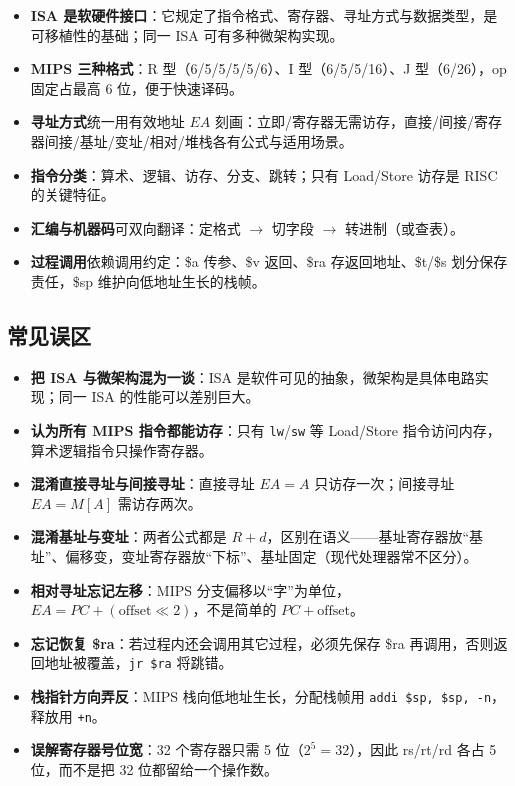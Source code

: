 \begin{itemize}
    \item \textbf{ISA 是软硬件接口}：它规定了指令格式、寄存器、寻址方式与数据类型，是可移植性的基础；同一 ISA 可有多种微架构实现。
    \item \textbf{MIPS 三种格式}：R 型（6/5/5/5/5/6）、I 型（6/5/5/16）、J 型（6/26），op 固定占最高 6 位，便于快速译码。
    \item \textbf{寻址方式}统一用有效地址 $EA$ 刻画：立即/寄存器无需访存，直接/间接/寄存器间接/基址/变址/相对/堆栈各有公式与适用场景。
    \item \textbf{指令分类}：算术、逻辑、访存、分支、跳转；只有 Load/Store 访存是 RISC 的关键特征。
    \item \textbf{汇编与机器码}可双向翻译：定格式 $\to$ 切字段 $\to$ 转进制（或查表）。
    \item \textbf{过程调用}依赖调用约定：\$a 传参、\$v 返回、\$ra 存返回地址、\$t/\$s 划分保存责任，\$sp 维护向低地址生长的栈帧。
\end{itemize}

\subsection{常见误区}

\begin{itemize}
    \item \textbf{把 ISA 与微架构混为一谈}：ISA 是软件可见的抽象，微架构是具体电路实现；同一 ISA 的性能可以差别巨大。
    \item \textbf{认为所有 MIPS 指令都能访存}：只有 \texttt{lw}/\texttt{sw} 等 Load/Store 指令访问内存，算术逻辑指令只操作寄存器。
    \item \textbf{混淆直接寻址与间接寻址}：直接寻址 $EA = A$ 只访存一次；间接寻址 $EA = M[A]$ 需访存两次。
    \item \textbf{混淆基址与变址}：两者公式都是 $R+d$，区别在语义——基址寄存器放“基址”、偏移变，变址寄存器放“下标”、基址固定（现代处理器常不区分）。
    \item \textbf{相对寻址忘记左移}：MIPS 分支偏移以“字”为单位，$EA = PC + (\text{offset} \ll 2)$，不是简单的 $PC + \text{offset}$。
    \item \textbf{忘记恢复 \$ra}：若过程内还会调用其它过程，必须先保存 \$ra 再调用，否则返回地址被覆盖，\texttt{jr \$ra} 将跳错。
    \item \textbf{栈指针方向弄反}：MIPS 栈向低地址生长，分配栈帧用 \texttt{addi \$sp, \$sp, -n}，释放用 \texttt{+n}。
    \item \textbf{误解寄存器号位宽}：32 个寄存器只需 5 位（$2^5=32$），因此 rs/rt/rd 各占 5 位，而不是把 32 位都留给一个操作数。
\end{itemize}
